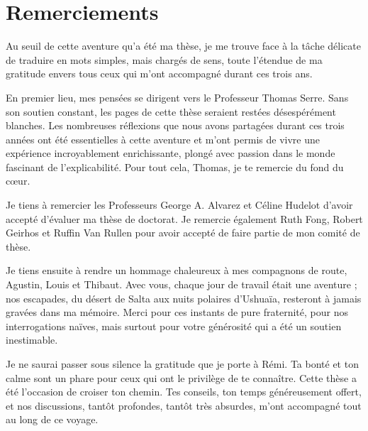\section*{Remerciements}

Au seuil de cette aventure qu'a été ma thèse, je me trouve face à la tâche délicate de traduire en mots simples, mais chargés de sens, toute l'étendue de ma gratitude envers tous ceux qui m'ont accompagné durant ces trois ans.

En premier lieu, mes pensées se dirigent vers le Professeur Thomas Serre. Sans son soutien constant, les pages de cette thèse seraient restées désespérément blanches. Les nombreuses réflexions que nous avons partagées durant ces trois années ont été essentielles à cette aventure et m'ont permis de vivre une expérience incroyablement enrichissante, plongé avec passion dans le monde fascinant de l'explicabilité. Pour tout cela, Thomas, je te remercie du fond du cœur.

Je tiens à remercier les Professeurs George A. Alvarez et Céline Hudelot d'avoir accepté d'évaluer ma thèse de doctorat. Je remercie également Ruth Fong, Robert Geirhos et Ruffin Van Rullen  pour avoir accepté de faire partie de mon comité de thèse.

Je tiens ensuite à rendre un hommage chaleureux à mes compagnons de route, Agustin, Louis et Thibaut. Avec vous, chaque jour de travail était une aventure ; nos escapades, du désert de Salta aux nuits polaires d'Ushuaïa, resteront à jamais gravées dans ma mémoire. Merci pour ces instants de pure fraternité, pour nos interrogations naïves, mais surtout pour votre générosité qui a été un soutien inestimable.

Je ne saurai passer sous silence la gratitude que je porte à Rémi. Ta bonté et ton calme sont un phare pour ceux qui ont le privilège de te connaître. Cette thèse a été l'occasion de croiser ton chemin. Tes conseils, ton temps généreusement offert, et nos discussions, tantôt profondes, tantôt très absurdes, m'ont accompagné tout au long de ce voyage.

